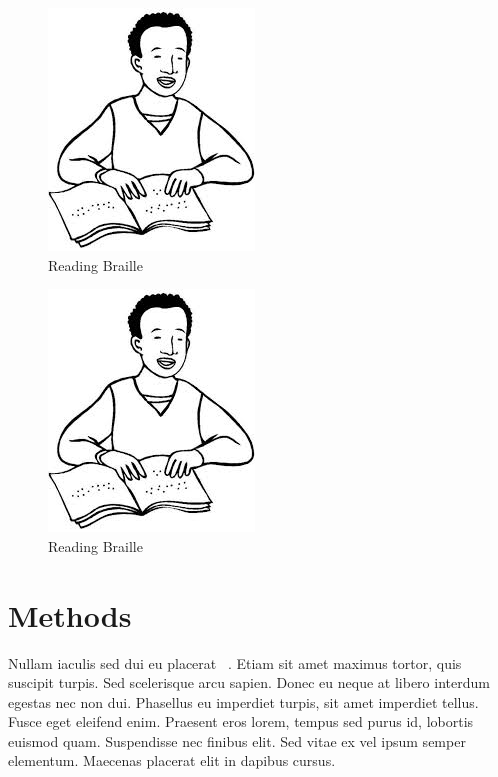 \documentclass[onecolumn]{article}
\makeatletter
\def\checkGraphicsWidth{\ifdim\Gin@nat@width>\linewidth
	\tsGraphicsScaleX\linewidth\else\Gin@nat@width\fi}
\def\fixFloatSize#1{}
\let\ts@includegraphics\includegraphics
\renewcommand{\includegraphics}[1]{\ts@includegraphics[width=\checkGraphicsWidth]{#1}}
\makeatother
\begin{document}
\bgroup
\begin{figure}[!htbp]
\centering \includegraphics{images/298377c4-2e5e-42fe-a79f-1ffa57ed81ce-uread-braille.jpg}
\caption{{Reading Braille}}
\label{f-056fed0128b2}
\end{figure}
\egroup



\begin{figure}[!ht]
\centering 
\includegraphics{images/298377c4-2e5e-42fe-a79f-1ffa57ed81ce-uread-braille.jpg}
\caption{{Reading Braille}}
\label{f-056fed0128b2}
\end{figure}


\section*{Methods}
Nullam iaculis sed dui eu placerat\unskip~\cite{572698:13280034} . Etiam
sit amet maximus tortor, quis suscipit turpis. Sed scelerisque arcu sapien.
Donec eu neque at libero interdum egestas nec non dui. Phasellus eu
imperdiet turpis, sit amet imperdiet tellus. Fusce eget eleifend enim.
Praesent eros lorem, tempus sed purus id, lobortis euismod quam.
Suspendisse nec finibus elit. Sed vitae ex vel ipsum semper elementum.
Maecenas placerat elit in dapibus cursus.
\end{document}
